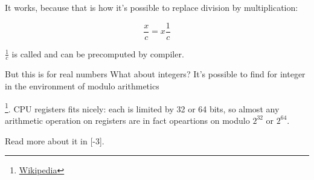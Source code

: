 It works, because that is how it's possible to replace division by multiplication:

\[
	\frac{x}{c} = x\frac{1}{c}
\]

$\frac{1}{c}$ is called  and can be precomputed by compiler.

But this is for real numbers
What about integers?
It's possible to find  for integer in the environment of modulo arithmetics

\footnote{\href{http://go.yurichev.com/17359}{Wikipedia}}.
\ac{CPU} registers fits nicely: each is limited by 32 or 64 bits, so almost any arithmetic operation on registers are in fact
opeartions on modulo $2^{32}$ or $2^{64}$.

Read more about it in [-3].
